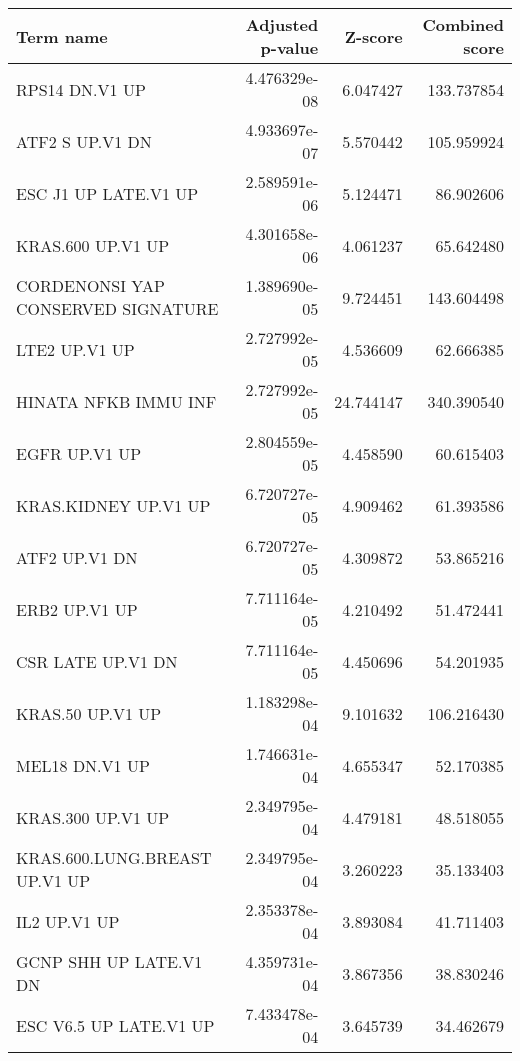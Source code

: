 \begin{tabular}{lrrr}
\toprule
                         Term name &  Adjusted p-value &   Z-score &  Combined score \\
\midrule
                    RPS14 DN.V1 UP &      4.476329e-08 &  6.047427 &      133.737854 \\
                   ATF2 S UP.V1 DN &      4.933697e-07 &  5.570442 &      105.959924 \\
              ESC J1 UP LATE.V1 UP &      2.589591e-06 &  5.124471 &       86.902606 \\
                 KRAS.600 UP.V1 UP &      4.301658e-06 &  4.061237 &       65.642480 \\
CORDENONSI YAP CONSERVED SIGNATURE &      1.389690e-05 &  9.724451 &      143.604498 \\
                     LTE2 UP.V1 UP &      2.727992e-05 &  4.536609 &       62.666385 \\
              HINATA NFKB IMMU INF &      2.727992e-05 & 24.744147 &      340.390540 \\
                     EGFR UP.V1 UP &      2.804559e-05 &  4.458590 &       60.615403 \\
              KRAS.KIDNEY UP.V1 UP &      6.720727e-05 &  4.909462 &       61.393586 \\
                     ATF2 UP.V1 DN &      6.720727e-05 &  4.309872 &       53.865216 \\
                     ERB2 UP.V1 UP &      7.711164e-05 &  4.210492 &       51.472441 \\
                 CSR LATE UP.V1 DN &      7.711164e-05 &  4.450696 &       54.201935 \\
                  KRAS.50 UP.V1 UP &      1.183298e-04 &  9.101632 &      106.216430 \\
                    MEL18 DN.V1 UP &      1.746631e-04 &  4.655347 &       52.170385 \\
                 KRAS.300 UP.V1 UP &      2.349795e-04 &  4.479181 &       48.518055 \\
     KRAS.600.LUNG.BREAST UP.V1 UP &      2.349795e-04 &  3.260223 &       35.133403 \\
                      IL2 UP.V1 UP &      2.353378e-04 &  3.893084 &       41.711403 \\
            GCNP SHH UP LATE.V1 DN &      4.359731e-04 &  3.867356 &       38.830246 \\
            ESC V6.5 UP LATE.V1 UP &      7.433478e-04 &  3.645739 &       34.462679 \\

\end{tabular}
